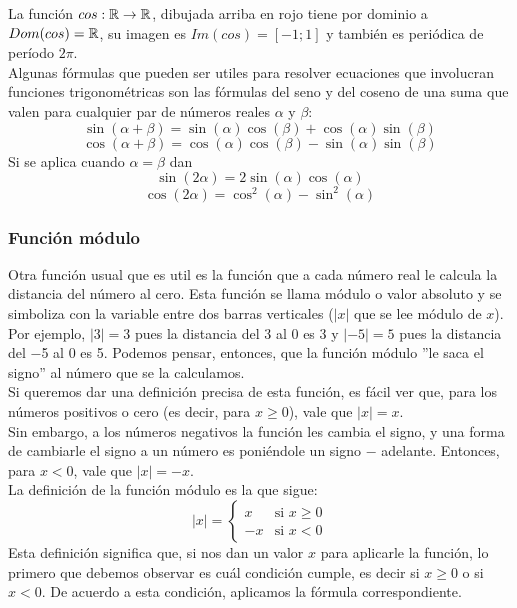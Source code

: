 \documentclass[../Teoría.root.tex]{subfiles}
\begin{document}
        La función \(cos:\mathbb{R}\rightarrow\mathbb{R}\), dibujada arriba en rojo tiene por dominio a \(Dom(cos) = \mathbb{R}\), su imagen es \(Im(cos) = [−1; 1]\) y también es periódica de período \(2\pi\).\\
        Algunas fórmulas que pueden ser utiles para resolver ecuaciones que involucran funciones trigonométricas son las fórmulas del seno y del coseno de una suma que valen para cualquier par de números reales \(\alpha\) y \(\beta\):
        \[\sin(\alpha+\beta)=\sin(\alpha)\cos(\beta)+\cos(\alpha)\sin(\beta)\]
        \[\cos(\alpha+\beta)=\cos(\alpha)\cos(\beta)-\sin(\alpha)\sin(\beta)\]
        Si se aplica cuando \(\alpha=\beta\) dan
        \[\sin(2\alpha)=2\sin(\alpha)\cos(\alpha)\]
        \[\cos(2\alpha)=\cos^2(\alpha)-\sin^2(\alpha)\]
        \subsubsection{Función módulo}
        Otra función usual que es util es la función que a cada número real le calcula la distancia del número al cero. Esta función se llama módulo o valor absoluto y se simboliza con la variable entre dos barras verticales (\(|x|\) que se lee módulo de \(x\)).\\
        Por ejemplo, \(|3| = 3\) pues la distancia del 3 al 0 es 3 y \(|−5| = 5\) pues la distancia del −5 al 0 es 5. Podemos pensar, entonces, que la función módulo ”le saca el signo” al número que se la calculamos.\\
        Si queremos dar una definición precisa de esta función, es fácil ver que, para los números positivos o cero (es decir, para \(x \geq 0\)), vale que \(|x| = x\).\\
        Sin embargo, a los números negativos la función les cambia el signo, y una forma de cambiarle el signo a un número es poniéndole un signo \(−\) adelante. Entonces, para \(x < 0\), vale que \(|x| = −x\).\\
        La definición de la función módulo es la que sigue: 
        \[|x|=
            \begin{cases}
                x & \text{si }x\geq0\\
                -x & \text{si }x<0
            \end{cases}
        \]
        Esta definición significa que, si nos dan un valor \(x\) para aplicarle la función, lo primero que debemos observar es cuál condición cumple, es decir si \(x \geq 0\) o si \(x < 0\). De acuerdo a esta condición, aplicamos la fórmula correspondiente.\\
\end{document}

